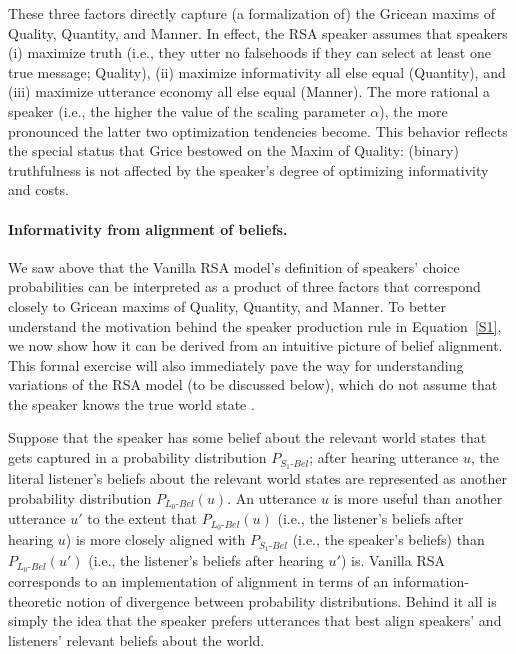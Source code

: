 \documentclass{sp}
\begin{document}
These three factors directly capture (a formalization of) the Gricean maxims of Quality,
Quantity, and Manner. In effect, the RSA speaker assumes that speakers (i) maximize truth
(i.e., they utter no falsehoods if they can select at least one
true message; Quality), (ii) maximize informativity all else equal (Quantity), and (iii) maximize utterance
economy all else equal (Manner). The more rational a speaker (i.e., the higher the value of the scaling parameter $\alpha$), the more
pronounced the latter two optimization tendencies become. This behavior reflects the special
status that Grice bestowed on the Maxim of Quality: (binary) truthfulness is not affected by
the speaker's degree of optimizing informativity and costs.

\paragraph{Informativity from alignment of beliefs.} We saw above that the Vanilla RSA
model's definition of speakers' choice probabilities can be interpreted as a product of three
factors that correspond closely to Gricean maxims of Quality, Quantity, and Manner.
To better understand the motivation behind the speaker production rule in Equation~\eqref{S1}, we now show how it can be derived from an intuitive picture of belief alignment.
This formal exercise will also immediately pave the way for understanding variations of the RSA model (to be discussed below), which do not assume that the speaker knows the true world state \citep{goodmanstuhlmuller2013,scontrasgoodman2017,HerbstrittFranke2019:Complex-probabi}.

Suppose that the speaker has some belief about the relevant world states that gets captured in a probability distribution $P_{S_{1}\text{-}Bel}$;
after hearing utterance $u$, the literal listener's beliefs about the relevant world states are represented as another probability distribution $P_{L_{0}\text{-}Bel}(u)$.
An utterance $u$ is more useful than another utterance $u'$ to the extent that $P_{L_{0}\text{-}Bel}(u)$  (i.e., the listener's beliefs after hearing $u$) is more closely aligned with $P_{S_{1}\text{-}Bel}$ (i.e., the speaker's beliefs) than $P_{L_{0}\text{-}Bel}(u')$ (i.e., the listener's beliefs after hearing $u'$) is.
Vanilla RSA corresponds to an implementation of alignment in terms of an information-theoretic notion of divergence between probability distributions.
Behind it all is simply the idea that the speaker prefers utterances that best align speakers' and listeners' relevant beliefs about the world.
\end{document}
